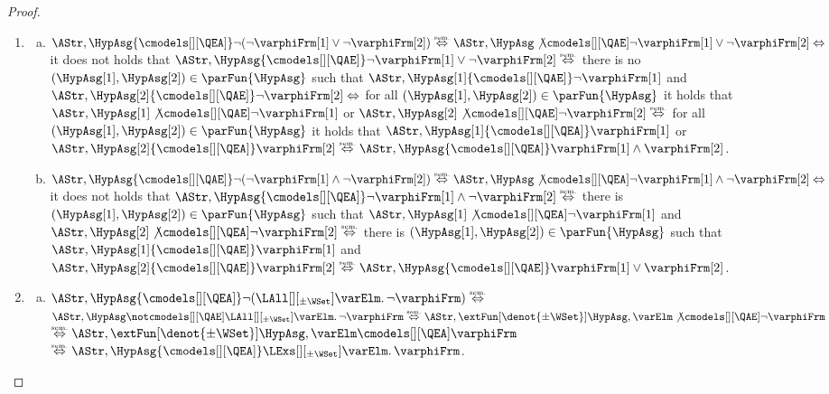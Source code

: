 \documentclass[authoryear]{elsarticle}
\newcommand{\iffExpl}[1]{\mathrel{\stackrel{\text{\tiny #1}}{\Leftrightarrow}}}
\newcommand{\EAmodels}{{\cmodels[][\QEA]}}
\newcommand{\AEmodels}{{\cmodels[][\QAE]}}
\begin{document}
\begin{proof}
\begin{enumerate}[1)]
\begin{enumerate}[a)]
    \item The claim follows from the observation that partitioning is
      associative.
    \end{enumerate}

  \item
    \begin{enumerate}[a)]
    \item
      $\AStr, \HypAsg \EAmodels \neg (\neg \varphiFrm[1] \lor \neg
      \varphiFrm[2]) \iffExpl{sem.} \AStr, \HypAsg \not\cmodels[][\QAE] \neg
      \varphiFrm[1] \lor \neg \varphiFrm[2] \iffExpl{}$ it does not holds that
      $\AStr, \HypAsg \AEmodels \neg \varphiFrm[1] \lor \neg \varphiFrm[2]
      \iffExpl{sem.}$ there is no $(\HypAsg[1], \HypAsg[2]) \in
      \parFun{\HypAsg}$ such that $\AStr, \HypAsg[1] \AEmodels
      \neg\varphiFrm[1]$ and $\AStr, \HypAsg[2] \AEmodels \neg\varphiFrm[2]
      \iffExpl{}$ for all $(\HypAsg[1], \HypAsg[2]) \in \parFun{\HypAsg}$ it
      holds that $\AStr, \HypAsg[1] \not\cmodels[][\QAE] \neg\varphiFrm[1]$ or
      $\AStr, \HypAsg[2] \not\cmodels[][\QAE] \neg\varphiFrm[2] \iffExpl{sem.}$
      for all $(\HypAsg[1], \HypAsg[2]) \in \parFun{\HypAsg}$ it holds that
      $\AStr, \HypAsg[1] \EAmodels \varphiFrm[1]$ or $\AStr, \HypAsg[2]
      \EAmodels \varphiFrm[2] \iffExpl{sem.} \AStr, \HypAsg \EAmodels
      \varphiFrm[1] \land \varphiFrm[2]$.

    \item $\AStr, \HypAsg \AEmodels \neg (\neg \varphiFrm[1] \land \neg
      \varphiFrm[2]) \iffExpl{sem.} \AStr, \HypAsg \not\cmodels[][\QEA] \neg
      \varphiFrm[1] \land \neg \varphiFrm[2] \iffExpl{}$ it does not holds that
      $\AStr, \HypAsg \EAmodels \neg \varphiFrm[1] \land \neg \varphiFrm[2]
      \iffExpl{sem.}$ there is $(\HypAsg[1], \HypAsg[2]) \in \parFun{\HypAsg}$
      such that $\AStr, \HypAsg[1] \not\cmodels[][\QEA] \neg\varphiFrm[1]$ and
      $\AStr, \HypAsg[2] \not\cmodels[][\QEA] \neg\varphiFrm[2] \iffExpl{sem.}$
      there is $(\HypAsg[1], \HypAsg[2]) \in \parFun{\HypAsg}$ such that $\AStr,
      \HypAsg[1] \AEmodels \varphiFrm[1]$ and $\AStr, \HypAsg[2] \AEmodels
      \varphiFrm[2] \iffExpl{sem.} \AStr, \HypAsg \AEmodels \varphiFrm[1] \vee
      \varphiFrm[2]$.
    \end{enumerate}

  \item
    \begin{enumerate}[a)]
    \item
      $\AStr, \HypAsg \EAmodels \neg (\LAll[][_{\pm\WSet}] \varElm \ldotp \neg
      \varphiFrm) \iffExpl{sem.}$ $\AStr, \HypAsg \notcmodels[][\QAE]
      \LAll[][_{\pm\WSet}] \varElm \ldotp \neg \varphiFrm \iffExpl{sem.}
      \AStr, \extFun[\denot{\pm\WSet}]{\HypAsg, \varElm} \not\cmodels[][\QAE]
      \neg \varphiFrm$ $\iffExpl{sem.} \AStr, \extFun[\denot{\pm\WSet}]{\HypAsg,
        \varElm} \EAmodels \varphiFrm $ $ \iffExpl{sem.} \AStr, \HypAsg
      \EAmodels \LExs[][_{\pm\WSet}] \varElm \ldotp \varphiFrm$.


\end{enumerate}
\end{enumerate}
\end{proof}
\end{document}
